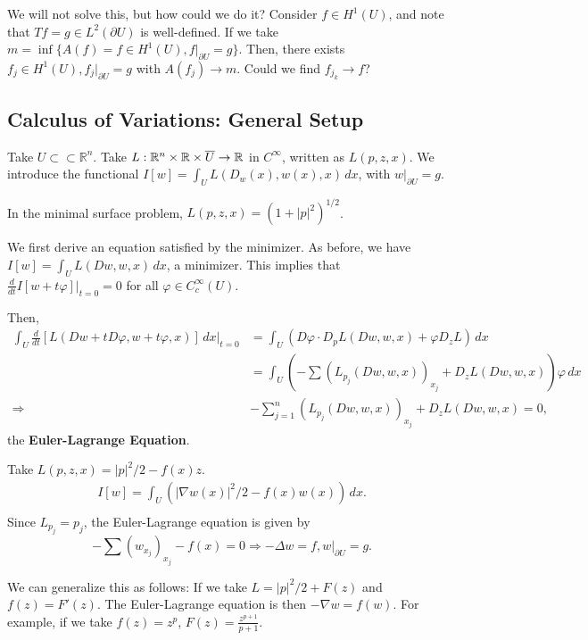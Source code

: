 \documentclass[12pt]{scrartcl}
\newcommand{\R}{\mathbb{R}}
\newcommand{\<}{\langle}
\renewcommand{\>}{\rangle}
\let \phi \varphi
\let \grad \nabla
\begin{document}
We will not solve this, but how could we do it?  Consider $f \in H^1(U)$, and note that $Tf = g \in L^2(\partial U)$ is well-defined.  If we take $m = \inf \{A(f) = f \in H^1(U), f \vert_{\partial U} = g\}$.  Then, there exists $f_j \in H^1(U), f_j \vert_{\partial U} = g$ with $A(f_j) \to m$.  Could we find $f_{j_k} \to f$?

\subsection{Calculus of Variations: General Setup}
Take $U \subset \subset \R^n$.  Take $L: \R^n \times \R \times \ol{U} \to \R$ in $C^\infty$, written as $L(p, z, x)$.  We introduce the functional $I[w] = \int_U L(D_w(x), w(x), x)\,dx$, with $w \vert_{\partial U} = g$.  

\begin{example} In the minimal surface problem, $L(p, z, x) = (1 + |p|^2)^{1/2}$.
\end{example}

We first derive an equation satisfied by the minimizer.  As before, we have $I[w] = \int_U L(Dw, w, x)\, dx$, a minimizer.  This implies that $\frac{d}{dt} I[w + t\phi] \vert_{t = 0}= 0$ for all $\phi \in C_c^\infty(U)$.

Then,
\begin{align*}
\int_U \frac{d}{dt} \left [L(Dw + tD\phi, w+t\phi, x) \right ]\,dx\vert_{t = 0} &= \int_U \left (D\phi \cdot D_pL(Dw, w, x) + \phi D_z L \right ) \,dx \\
&= \int_U \left (- \sum (L_{p_j}(Dw, w, x))_{x_j} + D_zL(Dw, w, x)\right ) \phi\,dx \\
\Longrightarrow &\boxed{-\sum_{j=1}^n (L_{p_j}(Dw, w, x))_{x_j} + D_zL(Dw, w, x) = 0},
\end{align*}
the \textbf{Euler-Lagrange Equation}. 
\begin{example} Take $L(p, z, x) = |p|^2/2 - f(x)z$.  
\begin{align*}
I[w] = \int_U \left (|\grad w(x)|^2/2 - f(x)w(x) \right )\,dx.\\
\end{align*}
Since $L_{p_j} = p_j$, the Euler-Lagrange equation is given by
$$-\sum(w_{x_j})_{x_j} -f(x) = 0 \Longrightarrow -\Delta w = f, w\vert_{\partial U} = g.$$
\end{example}

We can generalize this as follows:  If we take $L = |p|^2/2 + F(z)$ and $f(z) = F'(z)$.  The Euler-Lagrange equation is then $-\grad w = f(w)$.  For example, if we take $f(z) = z^p$, $F(z) = \frac{z^{p+1}}{p+1}$.
\end{document}
